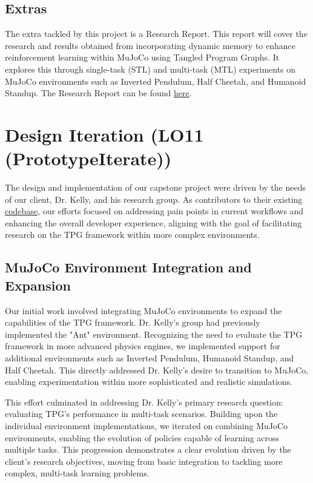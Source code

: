 \documentclass{article}
\begin{document}
\subsection{Extras}
The extra tackled by this project is a Research Report. This report will cover the research and results obtained from incorporating dynamic memory to enhance reinforcement learning within MuJoCo using Tangled Program Graphs.
It explores this through single-task (STL) and multi-task (MTL) experiments on MuJoCo environments such as Inverted Pendulum, Half Cheetah, and Humanoid Standup.
The Research Report can be found \href{https://github.com/TPGEngine/tpg/blob/main/docs/Extras/ResearchReport(Advanced)/ResearchReport.pdf}{here}.

\section{Design Iteration (LO11 (PrototypeIterate))}

The design and implementation of our capstone project were driven by the needs of our client, Dr. Kelly, and his research group. As contributors to their existing \href{https://gitlab.cas.mcmaster.ca/kellys32/tpg}{codebase}, our efforts focused on addressing pain points in current workflows and enhancing the overall developer experience, aligning with the goal of facilitating research on the TPG framework within more complex environments.

\subsection{MuJoCo Environment Integration and Expansion}

Our initial work involved integrating MuJoCo environments to expand the capabilities of the TPG framework. Dr. Kelly's group had previously implemented the "Ant" environment. Recognizing the need to evaluate the TPG framework in more advanced physics engines, we implemented support for additional environments such as Inverted Pendulum, Humanoid Standup, and Half Cheetah. This directly addressed Dr. Kelly's desire to transition to MuJoCo, enabling experimentation within more sophisticated and realistic simulations.

This effort culminated in addressing Dr. Kelly's primary research question: evaluating TPG's performance in multi-task scenarios. Building upon the individual environment implementations, we iterated on combining MuJoCo environments, enabling the evolution of policies capable of learning across multiple tasks. This progression demonstrates a clear evolution driven by the client's research objectives, moving from basic integration to tackling more complex, multi-task learning problems.
\end{document}
